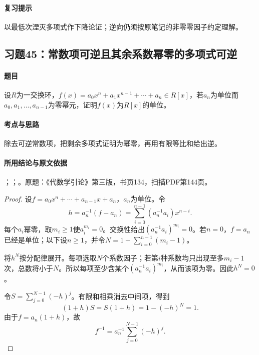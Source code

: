 \paragraph{复习提示}

以最低次湮灭多项式作下降论证；逆向仍须按原笔记的非零零因子约定理解。



\subsection{习题45：常数项可逆且其余系数幂零的多项式可逆}

\label{ex:3:45}

\paragraph{题目}

设$R$为一交换环，$f(x)=a_0x^n+a_1x^{n-1}+\cdots+a_n\in R[x]$，若$a_n$为单位而$a_0,a_1,\ldots,a_{n-1}$为零幂元，证明$f(x)$为$R[x]$的单位。

\paragraph{考点与思路}

除去可逆常数项，把剩余多项式证明为幂零，再用有限等比和给出逆。

\paragraph{所用结论与原文依据}

；；。原题：《代数学引论》第三版，书页134，扫描PDF第144页。


\begin{proof}

设$f=a_0x^n+\cdots+a_{n-1}x+a_n$，$a_n$为单位。令
\[
h=a_n^{-1}(f-a_n)=\sum_{i=0}^{n-1}(a_n^{-1}a_i)x^{n-i}.
\]
每个$a_i$幂零，取$m_i\ge1$使$a_i^{m_i}=0$。交换性给出$(a_n^{-1}a_i)^{m_i}=0$。若$n=0$，$f=a_n$已经是单位；以下设$n\ge1$，并令$N=1+\sum_{i=0}^{n-1}(m_i-1)$。

将$h^N$按分配律展开。每项选取$N$个系数因子；若第$i$种系数均只出现至多$m_i-1$次，总数将小于$N$。所以每项至少含某个$(a_n^{-1}a_i)^{m_i}$，从而该项为零。因此$h^N=0$。

令$S=\sum_{j=0}^{N-1}(-h)^j$。有限和相乘消去中间项，得到
\[
(1+h)S=S(1+h)=1-(-h)^N=1.
\]
由于$f=a_n(1+h)$，故
\[
\boxed{f^{-1}=a_n^{-1}\sum_{j=0}^{N-1}(-h)^j.}
\]

\end{proof}

